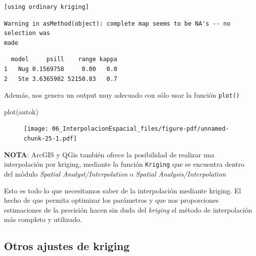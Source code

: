 \documentclass[
  letterpaper,
  DIV=11,
  numbers=noendperiod]{scrreprt}
\newenvironment{Shaded}{\begin{snugshade}}{\end{snugshade}}
\newcommand{\FunctionTok}[1]{\textcolor[rgb]{0.28,0.35,0.67}{#1}}
\newcommand{\NormalTok}[1]{\textcolor[rgb]{0.00,0.23,0.31}{#1}}
\newcommand{\SpecialCharTok}[1]{\textcolor[rgb]{0.37,0.37,0.37}{#1}}
\begin{document}
\begin{verbatim}
[using ordinary kriging]
\end{verbatim}

\begin{verbatim}
Warning in asMethod(object): complete map seems to be NA's -- no selection was
made
\end{verbatim}

\begin{Shaded}
\end{Shaded}

\begin{verbatim}
  model     psill    range kappa
1   Nug 0.1569758     0.00   0.0
2   Ste 3.6365982 52150.83   0.7
\end{verbatim}

Además, nos genera un output muy adecuado con sólo usar la función
\texttt{plot()}

\begin{Shaded}
\begin{Highlighting}[]
\FunctionTok{plot}\NormalTok{(autok)}
\end{Highlighting}
\end{Shaded}

\begin{figure}[H]

{\centering \texttt{[image: 06\_InterpolacionEspacial\_files/figure-pdf/unnamed-chunk-25-1.pdf]}

}

\end{figure}

\textbf{NOTA}: ArcGIS y QGis también ofrece la posibilidad de realizar
una interpolación por kriging, mediante la función \texttt{Kriging} que
se encuentra dentro del módulo \emph{Spatial Analyst/Interpolation} o
\emph{Spatial Analysis/Interpolation}

Esto es todo lo que necesitamos saber de la interpolación mediante
kriging. El hecho de que permita optimizar los parámetros y que nos
proporciones estimaciones de la precisión hacen sin duda del
\emph{kriging} el método de interpolación más completo y utilizado.

\hypertarget{otros-ajustes-de-kriging}{%
\subsection{Otros ajustes de kriging}\label{otros-ajustes-de-kriging}}
\end{document}
